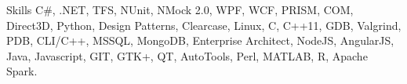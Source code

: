 \begin{category}{Skills}
\citemnobullet
C\#, .NET, TFS, NUnit, NMock 2.0, WPF, WCF, PRISM, COM, Direct3D, Python, Design Patterns, Clearcase, Linux, C, C++11, GDB, Valgrind, PDB, CLI/C++, MSSQL, MongoDB, Enterprise Architect, NodeJS, AngularJS, Java, Javascript, GIT, GTK+, QT, AutoTools, Perl, MATLAB, R, Apache Spark.
\end{category}
